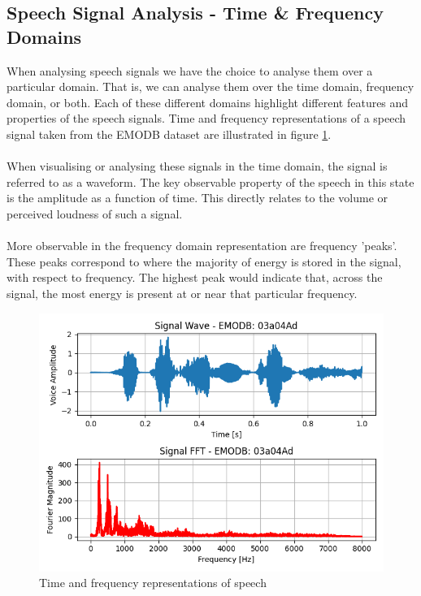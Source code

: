 \subsection{Speech Signal Analysis - Time \& Frequency Domains}
When analysing speech signals we have the choice to analyse them over a particular domain. That is, we can analyse them over the time domain, frequency domain, or both. Each of these different domains highlight different features and properties of the speech signals. Time and frequency representations of a speech signal taken from the EMODB dataset are illustrated in figure \ref{t_and_f_plot}. \\ \\
When visualising or analysing these signals in the time domain, the signal is referred to as a waveform. The key observable property of the speech in this state is the amplitude as a function of time. This directly relates to the volume or perceived loudness of such a signal. \\ \\
More observable in the frequency domain representation are frequency 'peaks'. These peaks correspond to where the majority of energy is stored in the signal, with respect to frequency. The highest peak would indicate that, across the signal, the most energy is present at or near that particular frequency.
\begin{figure}
        \centering
        \includegraphics[scale = 0.8]{images/PLOT_timeAndFreq.png}
        \caption{Time and frequency representations of speech}
        \label{t_and_f_plot}
\end{figure}

